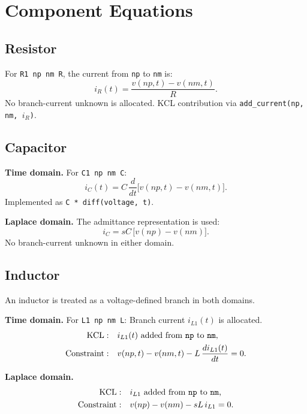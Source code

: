 \documentclass[11pt,a4paper]{article}
\newcommand{\code}[1]{\texttt{#1}}
\begin{document}
\section{Component Equations}
\label{sec:component-equations}

\subsection{Resistor}

For \code{R1 np nm R}, the current from \code{np} to \code{nm} is:
\begin{equation}
    i_R(t) = \frac{v(np,t) - v(nm,t)}{R}.
\end{equation}
No branch-current unknown is allocated.
KCL contribution via \code{add\_current(np, nm, \(i_R\))}.

\subsection{Capacitor}

\textbf{Time domain.} For \code{C1 np nm C}:
\begin{equation}
    i_C(t) = C\,\frac{d}{dt}\bigl[v(np,t) - v(nm,t)\bigr].
\end{equation}
Implemented as \code{C * diff(voltage, t)}.

\textbf{Laplace domain.} The admittance representation is used:
\begin{equation}
    i_C = sC\,\bigl[v(np) - v(nm)\bigr].
\end{equation}
No branch-current unknown in either domain.

\subsection{Inductor}

An inductor is treated as a voltage-defined branch in both domains.

\textbf{Time domain.} For \code{L1 np nm L}:
Branch current \(i_{L1}(t)\) is allocated.
\begin{align}
    \text{KCL}: & \quad i_{L1}(t) \text{ added from \code{np} to \code{nm},} \\
    \text{Constraint}: & \quad v(np,t) - v(nm,t) - L\,\frac{di_{L1}(t)}{dt} = 0.
\end{align}

\textbf{Laplace domain.}
\begin{align}
    \text{KCL}: & \quad i_{L1} \text{ added from \code{np} to \code{nm},} \\
    \text{Constraint}: & \quad v(np) - v(nm) - sL\,i_{L1} = 0.
\end{align}
\end{document}
